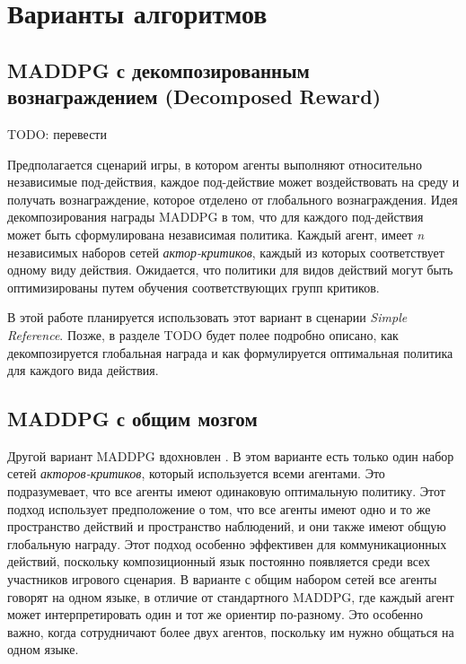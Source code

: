 \section{Варианты алгоритмов}

\subsection{MADDPG с декомпозированным вознаграждением (Decomposed Reward)} TODO: перевести

Предполагается сценарий игры, в котором агенты выполняют относительно независимые под-действия, каждое под-действие может воздействовать на среду и получать вознаграждение, которое отделено от глобального вознаграждения. Идея декомпозирования награды MADDPG в том, что для каждого под-действия может быть сформулирована независимая политика. Каждый агент, имеет \textit{n} независимых наборов сетей \textit{актор-критиков}, каждый из которых соответствует одному виду действия. Ожидается, что политики для видов действий могут быть оптимизированы путем обучения соответствующих групп критиков.

В этой работе планируется использовать этот вариант в сценарии \textit{Simple Reference}. Позже, в разделе TODO будет полее подробно описано, как декомпозируется глобальная награда и как формулируется оптимальная политика для каждого вида действия. %

\subsection{MADDPG с общим мозгом} %

Другой вариант MADDPG вдохновлен \cite{mordatch2017emergence}. В этом варианте есть только один набор сетей \textit{акторов-критиков}, который используется всеми агентами. Это подразумевает, что все агенты имеют одинаковую оптимальную политику. Этот подход использует предположение о том, что все агенты имеют одно и то же пространство действий и пространство наблюдений, и они также имеют общую глобальную награду. Этот подход особенно эффективен для коммуникационных действий, поскольку композиционный язык постоянно появляется среди всех участников игрового сценария. В варианте с общим набором сетей все агенты говорят на одном языке, в отличие от стандартного MADDPG, где каждый агент может интерпретировать один и тот же ориентир по-разному. Это особенно важно, когда сотрудничают более двух агентов, поскольку им нужно общаться на одном языке.
